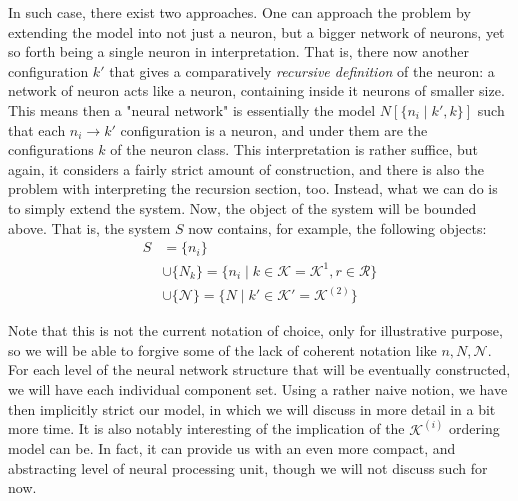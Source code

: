 In such case, there exist two approaches. One can approach the problem by extending the model into not just a neuron, but a bigger network of neurons, yet so forth being a single neuron in interpretation. That is, there now another configuration $k'$ that gives a comparatively \textit{recursive definition} of the neuron: a network of neuron acts like a neuron, containing inside it neurons of smaller size. This means then a "neural network" is essentially the model $N[\{n_{i}\mid k',k\}]$ such that each $n_{i}\to k'$ configuration is a neuron, and under them are the configurations $k$ of the neuron class. This interpretation is rather suffice, but again, it considers a fairly strict amount of construction, and there is also the problem with interpreting the recursion section, too. Instead, what we can do is to simply extend the system. Now, the object of the system will be bounded above. That is, the system $S$ now contains, for example, the following objects: 
\begin{equation}
    \begin{split}
        S &=  \{n_{i}\} \\ 
        &\cup  \{N_{k}\} = \{n_{i}\mid k \in \mathcal{K} = \mathcal{K}^{1}, r\in \mathcal{R}\}\\
        &\cup \{\mathcal{N}\} = \{ N\mid k' \in \mathcal{K}' = \mathcal{K}^{(2)} \} 
    \end{split}
\end{equation}

Note that this is not the current notation of choice, only for illustrative purpose, so we will be able to forgive some of the lack of coherent notation like $n,N,\mathcal{N}$. For each level of the neural network structure that will be eventually constructed, we will have each individual component set. Using a rather naive notion, we have then implicitly strict our model, in which we will discuss in more detail in a bit more time. It is also notably interesting of the implication of the $\mathcal{K}^{(i)}$ ordering model can be. In fact, it can provide us with an even more compact, and abstracting level of neural processing unit, though we will not discuss such for now. 

